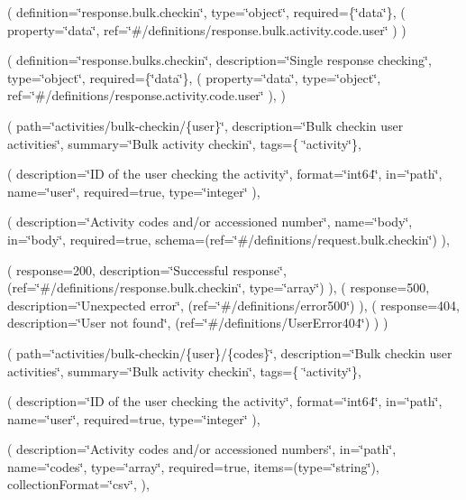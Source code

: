 ( definition=\char`\"{}response.\+bulk.\+checkin\char`\"{}, type=\char`\"{}object\char`\"{}, required=\{\char`\"{}data\char`\"{}\}, ( property=\char`\"{}data\char`\"{}, ref=\char`\"{}\#/definitions/response.\+bulk.\+activity.\+code.\+user\char`\"{} ) )

( definition=\char`\"{}response.\+bulks.\+checkin\char`\"{}, description=\char`\"{}\+Single response checking\char`\"{}, type=\char`\"{}object\char`\"{}, required=\{\char`\"{}data\char`\"{}\}, ( property=\char`\"{}data\char`\"{}, type=\char`\"{}object\char`\"{}, ref=\char`\"{}\#/definitions/response.\+activity.\+code.\+user\char`\"{} ), )

( path=\char`\"{}activities/bulk-\/checkin/\{user\}\char`\"{}, description=\char`\"{}\+Bulk checkin user activities\char`\"{}, summary=\char`\"{}\+Bulk activity checkin\char`\"{}, tags=\{ \char`\"{}activity\char`\"{}\},

( description=\char`\"{}\+I\+D of the user checking the activity\char`\"{}, format=\char`\"{}int64\char`\"{}, in=\char`\"{}path\char`\"{}, name=\char`\"{}user\char`\"{}, required=true, type=\char`\"{}integer\char`\"{} ),

( description=\char`\"{}\+Activity codes and/or accessioned number\char`\"{}, name=\char`\"{}body\char`\"{}, in=\char`\"{}body\char`\"{}, required=true, schema=(ref=\char`\"{}\#/definitions/request.\+bulk.\+checkin\char`\"{}) ),

( response=200, description=\char`\"{}\+Successful response\char`\"{}, (ref=\char`\"{}\#/definitions/response.\+bulk.\+checkin\char`\"{}, type=\char`\"{}array\char`\"{}) ), ( response=500, description=\char`\"{}\+Unexpected error\char`\"{}, (ref=\char`\"{}\#/definitions/error500\char`\"{}) ), ( response=404, description=\char`\"{}\+User not found\char`\"{}, (ref=\char`\"{}\#/definitions/\+User\+Error404\char`\"{}) ) )

( path=\char`\"{}activities/bulk-\/checkin/\{user\}/\{codes\}\char`\"{}, description=\char`\"{}\+Bulk checkin user activities\char`\"{}, summary=\char`\"{}\+Bulk activity checkin\char`\"{}, tags=\{ \char`\"{}activity\char`\"{}\},

( description=\char`\"{}\+I\+D of the user checking the activity\char`\"{}, format=\char`\"{}int64\char`\"{}, in=\char`\"{}path\char`\"{}, name=\char`\"{}user\char`\"{}, required=true, type=\char`\"{}integer\char`\"{} ),

( description=\char`\"{}\+Activity codes and/or accessioned numbers\char`\"{}, in=\char`\"{}path\char`\"{}, name=\char`\"{}codes\char`\"{}, type=\char`\"{}array\char`\"{}, required=true, items=(type=\char`\"{}string\char`\"{}), collection\+Format=\char`\"{}csv\char`\"{}, ),


